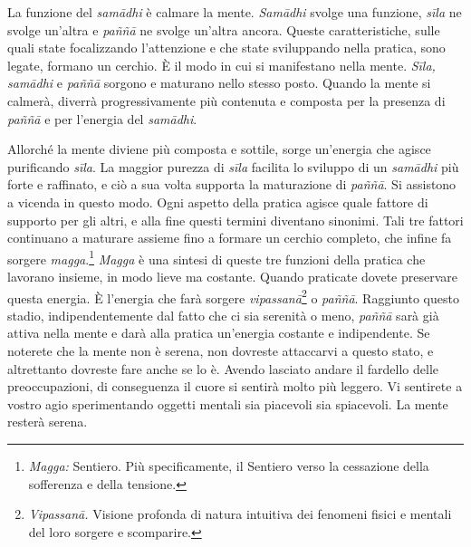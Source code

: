 La funzione del \emph{samādhi} è calmare la mente. \emph{Samādhi} svolge
una funzione, \emph{sīla} ne svolge un'altra e \emph{paññā} ne svolge
un'altra ancora. Queste caratteristiche, sulle quali state focalizzando
l'attenzione e che state sviluppando nella pratica, sono legate, formano
un cerchio. È il modo in cui si manifestano nella mente. \emph{Sīla,}
\emph{samādhi} e \emph{paññā} sorgono e maturano nello stesso posto.
Quando la mente si calmerà, diverrà progressivamente più contenuta e
composta per la presenza di \emph{paññā} e per l'energia del
\emph{samādhi}.

Allorché la mente diviene più composta e sottile, sorge un'energia che
agisce purificando \emph{sīla}. La maggior purezza di \emph{sīla}
facilita lo sviluppo di un \emph{samādhi} più forte e raffinato, e ciò a
sua volta supporta la maturazione di \emph{paññā}. Si assistono a
vicenda in questo modo. Ogni aspetto della pratica agisce quale fattore
di supporto per gli altri, e alla fine questi termini diventano
sinonimi. Tali tre fattori continuano a maturare assieme fino a formare
un cerchio completo, che infine fa sorgere \emph{magga}.\footnote{%
  \emph{Magga:}
  Sentiero. Più specificamente, il Sentiero verso la cessazione della
  sofferenza e della tensione.} \emph{Magga} è una sintesi di queste tre
funzioni della pratica che lavorano insieme, in modo lieve ma costante.
Quando praticate dovete preservare questa energia. È l'energia che farà
sorgere \emph{vipassanā}\footnote{\emph{Vipassanā.} Visione profonda di
  natura intuitiva dei fenomeni fisici e mentali del loro sorgere e
  scomparire.} o \emph{paññā}. Raggiunto questo stadio,
indipendentemente dal fatto che ci sia serenità o meno, \emph{paññā}
sarà già attiva nella mente e darà alla pratica un'energia costante e
indipendente. Se noterete che la mente non è serena, non dovreste
attaccarvi a questo stato, e altrettanto dovreste fare anche se lo è.
Avendo lasciato andare il fardello delle preoccupazioni, di conseguenza
il cuore si sentirà molto più leggero. Vi sentirete a vostro agio
sperimentando oggetti mentali sia piacevoli sia spiacevoli. La mente
resterà serena.

